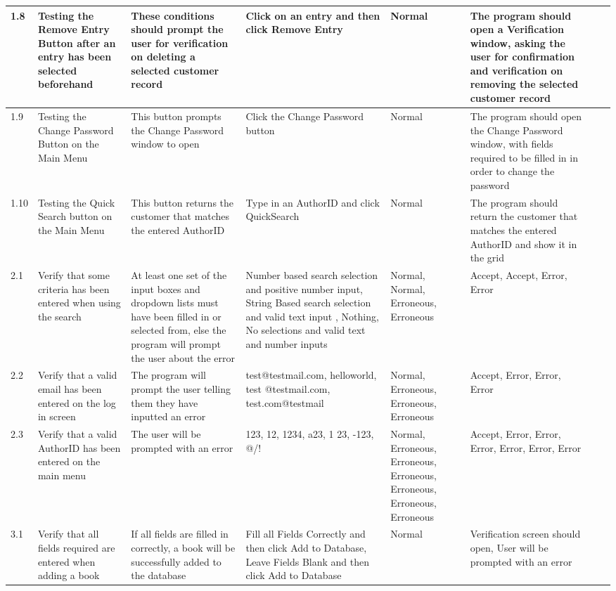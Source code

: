 \begin{landscape}
\begin{center}
\begin{longtable}{|p{1.5cm}|p{2.5cm}|p{2.5cm}|p{2cm}|p{2cm}|p{2cm}|p{2cm}|p{2cm}|}
        1.8 & Testing the Remove Entry Button after an entry has been selected beforehand & These conditions should prompt the user for verification on deleting a selected customer record & Click on an entry and then click Remove Entry & Normal & The program should open a Verification window, asking the user for confirmation and verification on removing the selected customer record & & \\ \hline
        1.9 & Testing the Change Password Button on the Main Menu & This button prompts the Change Password window to open & Click the Change Password button & Normal & The program should open the Change Password window, with fields required to be filled in in order to change the password & & \\ \hline
        1.10 & Testing the Quick Search button on the Main Menu & This button returns the customer that matches the entered AuthorID & Type in an AuthorID and click QuickSearch & Normal & The program should return the customer that matches the entered AuthorID and show it in the grid & & \\ \hline
        2.1 & Verify that some criteria has been entered when using the search & At least one set of the input boxes and dropdown lists must have been filled in or selected from, else the program will prompt the user about the error & Number based search selection and positive number input, String Based search selection and valid text input , Nothing, No selections and valid text and number inputs & Normal, Normal, Erroneous, Erroneous & Accept, Accept, Error, Error & & \\ \hline
        2.2 & Verify that a valid email has been entered on the log in screen &  The program will prompt the user telling them they have inputted an error & test@testmail.com, helloworld, test @testmail.com, test.com@testmail & Normal, Erroneous, Erroneous, Erroneous & Accept, Error, Error, Error & & \\ \hline
        2.3 & Verify that a valid AuthorID has been entered on the main menu & The user will be prompted with an error & 123, 12, 1234, a23, 1 23, -123, @/! & Normal, Erroneous, Erroneous, Erroneous, Erroneous, Erroneous, Erroneous & Accept, Error, Error, Error, Error, Error, Error & & \\ \hline
        3.1 & Verify that all fields required are entered when adding a book & If all fields are filled in correctly, a book will be successfully added to the database & Fill all Fields Correctly and then click Add to Database, Leave Fields Blank and then click Add to Database & Normal & Verification screen should open, User will be prompted with an error & & \\ \hline

\end{longtable}
\end{center}
\end{landscape}
